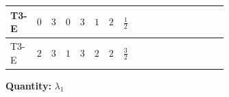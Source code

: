 \documentclass[8pt]{article}
\begin{document}
\begin{landscape}
\begin{longtable}{@{}llcccccc >{\raggedright\arraybackslash}p{0.21\linewidth} >{\raggedright\arraybackslash}p{0.21\linewidth} >{\raggedright\arraybackslash}p{0.21\linewidth}@{}}
\midrule
T3-E & $0$ & $3$ & $0$ & $3$ & $1$ & $2$ & $\frac{1}{2}$ & \scriptsize\adjustbox{max width=\linewidth}{$\begin{gathered} +12 {\lambda_1}^2\end{gathered}$} & \scriptsize\adjustbox{max width=\linewidth}{$\begin{gathered} +6 {\lambda_{HS_1}^{(1)}}^2\end{gathered}$} & \scriptsize\adjustbox{max width=\linewidth}{$\begin{gathered} +6 {\lambda_{HS_2}^{(1)}}^2\end{gathered}$} \\
\midrule
T3-E & $2$ & $3$ & $1$ & $3$ & $2$ & $2$ & $\frac{3}{2}$ & \scriptsize\adjustbox{max width=\linewidth}{$\begin{gathered} +12 {\lambda_1}^2\end{gathered}$} & \scriptsize\adjustbox{max width=\linewidth}{$\begin{gathered} +6 {\lambda_{HS_1}^{(1)}}^2\end{gathered}$} & \scriptsize\adjustbox{max width=\linewidth}{$\begin{gathered} +6 {\lambda_{HS_2}^{(1)}}^2\end{gathered}$} \\
\midrule
\bottomrule
\end{longtable}
\clearpage
\noindent\textbf{Quantity: }$\lambda_1$\par\smallskip

\end{landscape}
\end{document}

